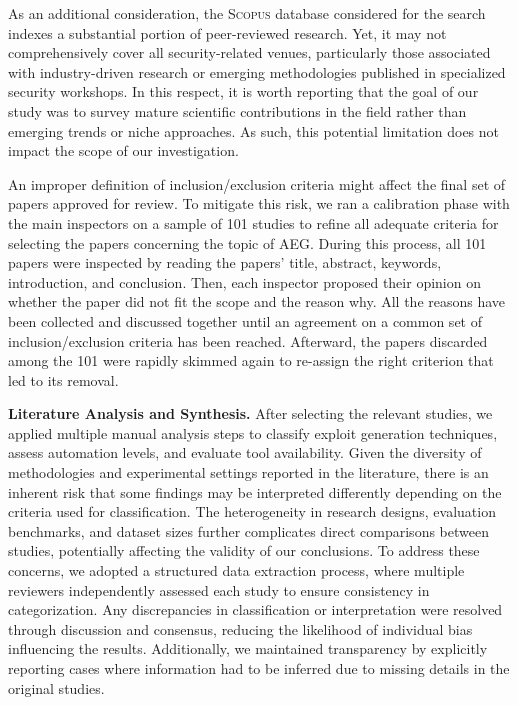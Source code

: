 As an additional consideration, the \textsc{Scopus} database considered for the search indexes a substantial portion of peer-reviewed research. Yet, it may not comprehensively cover all security-related venues, particularly those associated with industry-driven research or emerging methodologies published in specialized security workshops.
In this respect, it is worth reporting that the goal of our study was to survey mature scientific contributions in the field rather than emerging trends or niche approaches. As such, this potential limitation does not impact the scope of our investigation. 

An improper definition of inclusion/exclusion criteria might affect the final set of papers approved for review. To mitigate this risk, we ran a calibration phase with the main inspectors on a sample of 101 studies to refine all adequate criteria for selecting the papers concerning the topic of AEG. During this process, all 101 papers were inspected by reading the papers' title, abstract, keywords, introduction, and conclusion. Then, each inspector proposed their opinion on whether the paper did not fit the scope and the reason why. All the reasons have been collected and discussed together until an agreement on a common set of inclusion/exclusion criteria has been reached.
Afterward, the papers discarded among the 101 were rapidly skimmed again to re-assign the right criterion that led to its removal.

\smallskip
\textbf{Literature Analysis and Synthesis.} After selecting the relevant studies, we applied multiple manual analysis steps to classify exploit generation techniques, assess automation levels, and evaluate tool availability. Given the diversity of methodologies and experimental settings reported in the literature, there is an inherent risk that some findings may be interpreted differently depending on the criteria used for classification. The heterogeneity in research designs, evaluation benchmarks, and dataset sizes further complicates direct comparisons between studies, potentially affecting the validity of our conclusions. To address these concerns, we adopted a structured data extraction process, where multiple reviewers independently assessed each study to ensure consistency in categorization. Any discrepancies in classification or interpretation were resolved through discussion and consensus, reducing the likelihood of individual bias influencing the results. Additionally, we maintained transparency by explicitly reporting cases where information had to be inferred due to missing details in the original studies. 